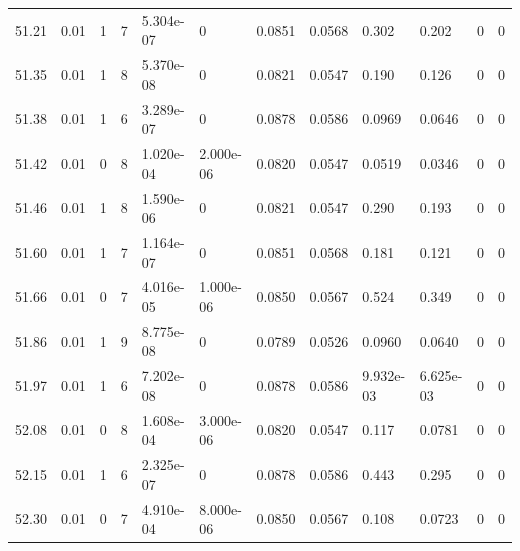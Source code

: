 \documentclass[preview]{standalone}
\begin{document}
{{{{{{{{{{{{{\begin{tabular}{L{1.2cm}C{1.2cm} C{0.3cm}C{0.5cm} C{1.4cm}C{1.4cm} C{1.4cm}C{1.4cm} C{1.6cm}C{1.6cm} C{1.6cm}C{1.6cm}}
  51.21  &  0.01  & 1     &  7 &  5.304e-07  & 0  &  0.0851&   0.0568& 0.302 & 0.202   &  0 & 0  \\ 
  51.35  &  0.01  & 1     &  8 &  5.370e-08  & 0  &  0.0821&   0.0547& 0.190 & 0.126   &  0 & 0  \\ 
  51.38  &  0.01  & 1     &  6 &  3.289e-07  & 0  &  0.0878&   0.0586& 0.0969 & 0.0646   &  0 & 0  \\ 
  51.42  &  0.01  & 0     &  8 &  1.020e-04  & 2.000e-06  &  0.0820&   0.0547& 0.0519 & 0.0346   &  0 & 0  \\ 
  51.46  &  0.01  & 1     &  8 &  1.590e-06  & 0  &  0.0821&   0.0547& 0.290 & 0.193   &  0 & 0  \\ 
  51.60  &  0.01  & 1     &  7 &  1.164e-07  & 0  &  0.0851&   0.0568& 0.181 & 0.121   &  0 & 0  \\ 
  51.66  &  0.01  & 0     &  7 &  4.016e-05  & 1.000e-06  &  0.0850&   0.0567& 0.524 & 0.349   &  0 & 0  \\ 
  51.86  &  0.01  & 1     &  9 &  8.775e-08  & 0  &  0.0789&   0.0526& 0.0960 & 0.0640   &  0 & 0  \\ 
  51.97  &  0.01  & 1     &  6 &  7.202e-08  & 0  &  0.0878&   0.0586& 9.932e-03 & 6.625e-03   &  0 & 0  \\ 
  52.08  &  0.01  & 0     &  8 &  1.608e-04  & 3.000e-06  &  0.0820&   0.0547& 0.117 & 0.0781   &  0 & 0  \\ 
  52.15  &  0.01  & 1     &  6 &  2.325e-07  & 0  &  0.0878&   0.0586& 0.443 & 0.295   &  0 & 0  \\ 
  52.30  &  0.01  & 0     &  7 &  4.910e-04  & 8.000e-06  &  0.0850&   0.0567& 0.108 & 0.0723   &  0 & 0  \\ 
\hline 
\end{tabular} 

}}}}}}}}}}}}}
\end{document}
